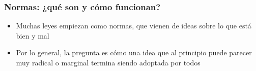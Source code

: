 \begin{frame}
\frametitle{Normas: ¿qué son y cómo funcionan?}
\centering

\begin{itemize}
  \item Muchas leyes empiezan como normas, que vienen de ideas sobre lo que está bien y mal
  \item Por lo general, la pregunta es cómo una idea que al principio puede parecer muy radical o marginal termina siendo adoptada por todos
\end{itemize}

\end{frame}
\note{}

\note{}

\note{}

\note{}

\note{}

\note{}

\note{}


